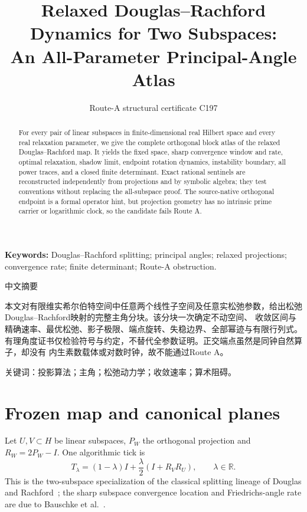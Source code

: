 \documentclass[9pt]{extarticle}
\title{Relaxed Douglas--Rachford Dynamics for Two Subspaces:\\
An All-Parameter Principal-Angle Atlas}
\author{Route-A structural certificate C197}
\date{}
\begin{document}
\maketitle
\begin{abstract}
For every pair of linear subspaces in finite-dimensional real Hilbert space
and every real relaxation parameter, we give the complete orthogonal block
atlas of the relaxed Douglas--Rachford map.  It yields the fixed space, sharp
convergence window and rate, optimal relaxation, shadow limit, endpoint
rotation dynamics, instability boundary, all power traces, and a closed finite
determinant.  Exact rational sentinels are reconstructed independently from
projections and by symbolic algebra; they test conventions without replacing
the all-subspace proof.  The source-native orthogonal endpoint is a formal
operator hint, but projection geometry has no intrinsic prime carrier or
logarithmic clock, so the candidate fails Route A.
\end{abstract}
\noindent\textbf{Keywords:} Douglas--Rachford splitting; principal angles;
relaxed projections; convergence rate; finite determinant; Route-A obstruction.

\begin{otherlanguage}{chinese-simplified}
\begin{center}{\large 中文摘要}\end{center}
本文对有限维实希尔伯特空间中任意两个线性子空间及任意实松弛参数，给出松弛
\foreignlanguage{english}{Douglas--Rachford}映射的完整主角分块。该分块一次确定不动空间、
收敛区间与精确速率、最优松弛、影子极限、端点旋转、失稳边界、全部幂迹与有限行列式。
有理角度证书仅检验符号与约定，不替代全参数证明。正交端点虽然是同钟自然算子，却没有
内生素数载体或对数时钟，故不能通过\foreignlanguage{english}{Route A}。

\noindent 关键词：投影算法；主角；松弛动力学；收敛速率；算术阻碍。
\end{otherlanguage}

\section{Frozen map and canonical planes}
Let $U,V\subset H$ be linear subspaces, $P_W$ the orthogonal projection and
$R_W=2P_W-I$.  One algorithmic tick is
\[
 T_\lambda=(1-\lambda)I+\frac{\lambda}{2}(I+R_VR_U),\qquad \lambda\in\mathbb R.
\]
This is the two-subspace specialization of the classical splitting lineage
of Douglas and Rachford~\cite{DR56}; the sharp subspace convergence location
and Friedrichs-angle rate are due to Bauschke et al.~\cite{B14}.
\end{document}
